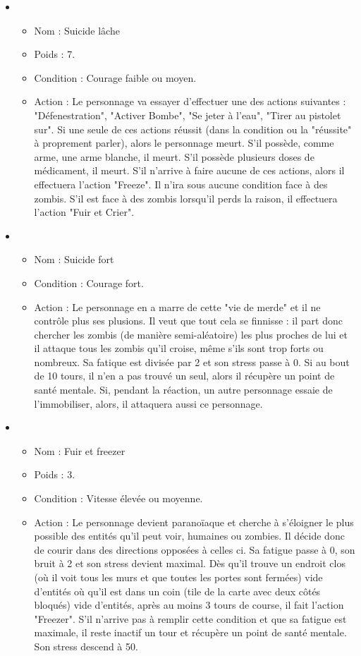 \begin{itemize}
   \item \begin{itemize}
   		\item Nom : Suicide lâche
   		\item Poids : 7.
   	 	\item Condition : Courage faible ou moyen.
   	 	\item Action : Le personnage va essayer d'effectuer une des actions suivantes : "Défenestration", "Activer Bombe", "Se jeter à l'eau", "Tirer au pistolet sur". Si une seule de ces actions réussit (dans la condition ou la "réussite" à proprement parler), alors le personnage meurt. S'il possède, comme arme, une arme blanche, il meurt. S'il possède plusieurs doses de médicament, il meurt. S'il n'arrive à faire aucune de ces actions, alors il effectuera l'action "Freeze". Il n'ira sous aucune condition face à des zombis. S'il est face à des zombis lorsqu'il perds la raison, il effectuera l'action "Fuir et Crier".
   \end{itemize}
      \item \begin{itemize}
   		\item Nom : Suicide fort
   	 	\item Condition : Courage fort.
   	 	\item Action : Le personnage en a marre de cette "vie de merde" et il ne contrôle plus ses plusions. Il veut que tout cela se finnisse : il part donc chercher les zombis (de manière semi-aléatoire) les plus proches de lui et il attaque tous les zombis qu'il croise, même s'ils sont trop forts ou nombreux. Sa fatique est divisée par 2 et son stress passe à 0. Si au bout de 10 tours, il n'en a pas trouvé un seul, alors il récupère un point de santé mentale. Si, pendant la réaction, un autre personnage essaie de l'immobiliser, alors, il attaquera aussi ce personnage.
   \end{itemize}
   \item \begin{itemize}
   		\item Nom : Fuir et freezer
   		\item Poids : 3.
   	 	\item Condition : Vitesse élevée ou moyenne.
   	 	\item Action : Le personnage devient paranoïaque et cherche à s'éloigner le plus possible des entités qu'il peut voir, humaines ou zombies. Il décide donc de courir dans des directions opposées à celles ci. Sa fatigue passe à 0, son bruit à 2 et son stress devient maximal. Dès qu'il trouve un endroit clos (où il voit tous les murs et que toutes les portes sont fermées) vide d'entités où qu'il est dans un coin (tile de la carte avec deux côtés bloqués) vide d'entités, après au moins 3 tours de course, il fait l'action "Freezer". S'il n'arrive pas à remplir cette condition et que sa fatigue est maximale, il reste inactif un tour et récupère un point de santé mentale. Son stress descend à 50.

\end{itemize}
\end{itemize}

